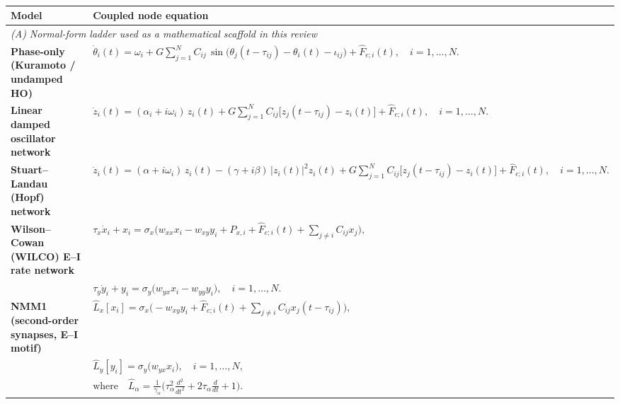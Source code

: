 \documentclass[12pt]{article}
\numberwithin{equation}{section}
\begin{document}
\begin{landscape}


\begin{tcolorbox}[
  colback=gray!5,
  colframe=slate,
  boxrule=0.4pt,
  enhanced,
  sharp corners,
  left=4pt,right=4pt,top=3pt,bottom=3pt,
  boxsep=2pt,
]

\\[-1mm]

\vspace{1mm}

\tiny
\renewcommand{\arraystretch}{0.9}
\small
\begin{tabular}{p{} >{\centering\arraybackslash}p{}}
\hline
\textbf{Model} & \textbf{Coupled node equation} \\
\hline

\multicolumn{2}{l}{\textit{(A) Normal-form ladder used as a mathematical scaffold in this review}} \\
\hline

\textbf{Phase-only (Kuramoto / undamped HO)} &
$\displaystyle
\dot{\theta}_i(t) = \omega_i
+ G\sum_{j=1}^{N} C_{ij}\,
\sin\!\big(\theta_j(t-\tau_{ij})-\theta_i(t)-\iota_{ij}\big)
+ \hat{F}_{e;i}(t),\quad i=1,\dots,N.$
\\
\hline

\textbf{Linear damped oscillator network} &
$\displaystyle
\dot{z}_i(t) = (\alpha_i+i\omega_i)\,z_i(t)
+ G\sum_{j=1}^{N} C_{ij}\big[z_j(t-\tau_{ij})-z_i(t)\big]
+ \hat{F}_{e;i}(t),\quad i=1,\dots,N.$
\\
\hline

\textbf{Stuart--Landau (Hopf) network} &
$\displaystyle
\dot{z}_i(t) = (\alpha+i\omega_i)\,z_i(t) - (\gamma+i\beta)\,|z_i(t)|^2 z_i(t)
+ G\sum_{j=1}^{N} C_{ij}\big[z_j(t-\tau_{ij})-z_i(t)\big]
+ \hat{F}_{e;i}(t),\quad i=1,\dots,N.$
\\
\hline

\textbf{Wilson--Cowan (WILCO) E--I rate network} &
$\displaystyle
\tau_x \dot{x}_i + x_i = \sigma_x\!\Big(w_{xx}x_i-w_{xy}y_i+P_{x,i}+\hat{F}_{e;i}(t)+\sum_{j\neq i} C_{ij}x_j\Big),$
\\[-1mm]
& $\displaystyle
\tau_y \dot{y}_i + y_i = \sigma_y\!\big(w_{yx}x_i-w_{yy}y_i\big),\quad i=1,\dots,N.$
\\
\hline

\textbf{NMM1 (second-order synapses, E--I motif)} &
$\displaystyle
\hat{L}_x[x_i] = \sigma_x\!\Big(-w_{xy}y_i+\hat{F}_{e;i}(t)+\sum_{j\neq i} C_{ij}x_j(t-\tau_{ij})\Big),$
\\[-1mm]
& $\displaystyle
\hat{L}_y[y_i] = \sigma_y\!\big(w_{yx}x_i\big),\quad i=1,\dots,N,$
\\[-1mm]
& $\displaystyle
\text{where}\quad \hat{L}_\alpha=\frac{1}{\gamma_\alpha}\Big(\tau_\alpha^2\frac{d^2}{dt^2}+2\tau_\alpha\frac{d}{dt}+1\Big).$
\\
\hline


\end{tabular}
\end{tcolorbox}
\end{landscape}
\end{document}

